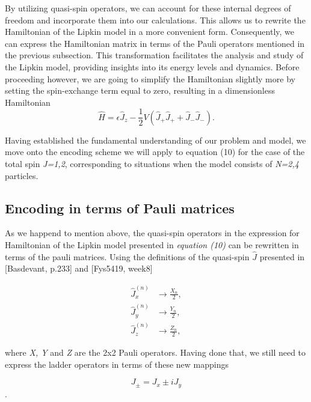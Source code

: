 \documentclass[onecolumn,10pt,cleanfoot]{asme2ej}
\begin{document}
By utilizing quasi-spin operators, we can account for these internal degrees of freedom and incorporate them into our calculations. This allows us to rewrite the Hamiltonian of the Lipkin model in a more convenient form. Consequently, we can express the Hamiltonian matrix in terms of the Pauli operators mentioned in the previous subsection. This transformation facilitates the analysis and study of the Lipkin model, providing insights into its energy levels and dynamics. Before proceeding however, we are going to simplify the Hamiltonian slightly more by setting the spin-exchange term equal to zero, resulting in a dimensionless Hamiltonian
\begin{equation}
\hat{H} = \epsilon\hat{J}_z - \frac{1}{2}V(\hat{J}_+\hat{J}_+ + \hat{J}_-\hat{J}_-).
\end{equation}

Having established the fundamental understanding of our problem and model, we move onto the encoding scheme we will apply to equation (10) for the case of the total spin \textit{J=1,2}, corresponding to situations when the model consists of \textit{N=2,4} particles.

\subsection{Encoding in terms of Pauli matrices}
As we happend to mention above, the quasi-spin operators in the expression for Hamiltonian of the Lipkin model presented in \textit{equation (10)} can be rewritten in terms of the pauli matrices. Using the definitions of the quasi-spin $\hat{J}$ presented in [Basdevant, p.233] and [Fys5419, week8] 

\begin{equation}
\begin{aligned}
	\hat{J}_x^{(n)} &\rightarrow \frac{X_n}{2}, \\
	\hat{J}_y^{(n)} &\rightarrow \frac{Y_n}{2}, \\
	\hat{J}_z^{(n)} &\rightarrow \frac{Z_n}{2}, 
\end{aligned}
\end{equation}

where \textit{X, Y} and \textit{Z} are the 2x2 Pauli operators. Having done that, we still need to express the ladder operators in terms of these new mappings

\begin{equation}
J_{\pm} = J_x \pm iJ_y
\end{equation}. 
\end{document}

